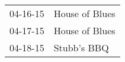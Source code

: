 \begin{supertabular}{p{0.25\columnwidth}p{0.75\columnwidth}}
 04-16-15 &  House of Blues \\
 04-17-15 &  House of Blues \\
 04-18-15 &     Stubb's BBQ \\
\end{supertabular}
